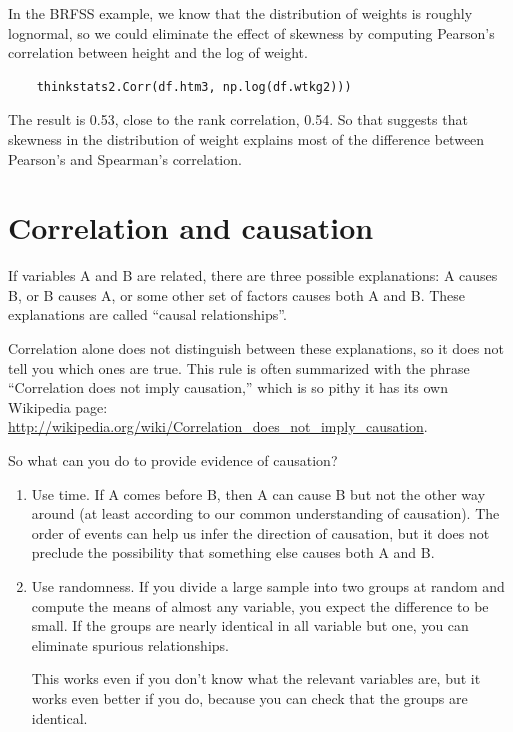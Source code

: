 \documentclass[12pt]{book}
\begin{document}
In the BRFSS example, we know that the distribution of weights is
roughly lognormal, so we could eliminate the effect of skewness
by computing Pearson's
correlation between height and the log of weight.

\begin{verbatim}
    thinkstats2.Corr(df.htm3, np.log(df.wtkg2)))
\end{verbatim}

The result is 0.53, close to the rank correlation, 0.54.  So that
suggests that skewness in the distribution of weight explains most of
the difference between Pearson's and Spearman's correlation.


\section{Correlation and causation}

If variables A and B are related, there are three possible
explanations: A causes B, or B causes A, or some other set of factors
causes both A and B.  These explanations are called ``causal
relationships''.

Correlation alone does not distinguish between these explanations,
so it does not tell you which ones are true.
This rule is often summarized with the phrase ``Correlation
does not imply causation,'' which is so pithy it has its own
Wikipedia page: \url{http://wikipedia.org/wiki/Correlation_does_not_imply_causation}.

So what can you do to provide evidence of causation?

\begin{enumerate}

\item Use time.  If A comes before B, then A can cause B but not the
  other way around (at least according to our common understanding of
  causation).  The order of events can help us infer the direction
  of causation, but it does not preclude the possibility that something
  else causes both A and B.

\item Use randomness.  If you divide a large sample into two
  groups at random and compute the means of almost any variable, you
  expect the difference to be small.
  If the groups are nearly identical in all variable but one, you
  can eliminate spurious relationships.

  This works even if you don't know what the relevant variables
  are, but it works even better if you do, because you can check that
  the groups are identical.

\end{enumerate}
\end{document}
